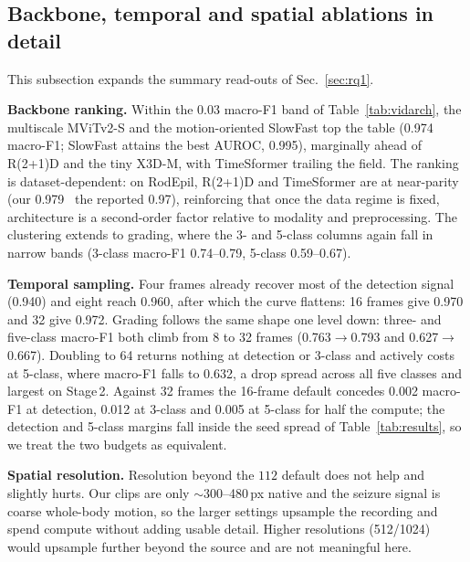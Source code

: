 \subsection{Backbone, temporal and spatial ablations in detail}
\label{sec:extraresults:ablations}
This subsection expands the summary read-outs of Sec.~\ref{sec:rq1}.

\noindent\textbf{Backbone ranking.}
Within the 0.03 macro-F1 band of Table~\ref{tab:vidarch}, the multiscale MViTv2-S and
the motion-oriented SlowFast top the table (0.974 macro-F1; SlowFast attains the best
AUROC, 0.995), marginally ahead of R(2+1)D and the tiny X3D-M, with TimeSformer
trailing the field. The ranking is dataset-dependent: on RodEpil, R(2+1)D and
TimeSformer are at near-parity (our 0.979 \vs\ the reported 0.97), reinforcing that
once the data regime is fixed, architecture is a second-order factor relative to
modality and preprocessing. The clustering extends to grading, where the 3- and
5-class columns again fall in narrow bands (3-class macro-F1 0.74--0.79, 5-class
0.59--0.67).

\noindent\textbf{Temporal sampling.}
Four frames already recover most of the detection signal (0.940) and eight reach
0.960, after which the curve flattens: 16 frames give 0.970 and 32 give 0.972. Grading follows the same shape one level down: three- and five-class macro-F1 both
climb from 8 to 32 frames (0.763$\to$0.793 and 0.627$\to$0.667). Doubling to 64
returns nothing at detection or 3-class and actively costs at 5-class, where macro-F1
falls to 0.632, a drop spread across all five classes and largest on Stage\,2. Against 32 frames the 16-frame default concedes 0.002 macro-F1 at detection, 0.012 at
3-class and 0.005 at 5-class for half the compute; the detection and 5-class margins
fall inside the seed spread of Table~\ref{tab:results}, so we treat the two budgets
as equivalent.

\noindent\textbf{Spatial resolution.}
Resolution beyond the $112$ default does not help and slightly hurts. Our clips are
only $\sim$300--480\,px native and the seizure signal is coarse whole-body motion, so
the larger settings upsample the recording and spend compute without adding usable
detail. Higher resolutions (512/1024) would upsample further beyond the source and
are not meaningful here.

